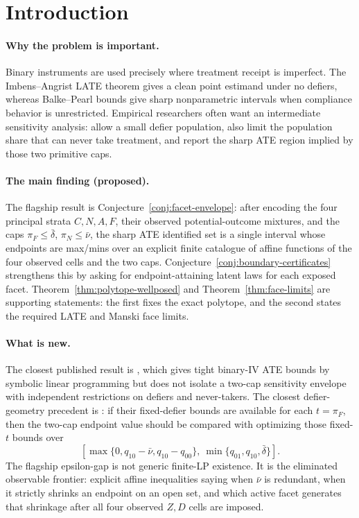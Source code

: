 \documentclass[11pt]{article}
\theoremstyle{definition}
\theoremstyle{plain}
\theoremstyle{remark}
\begin{document}
\section{Introduction}
\paragraph{Why the problem is important.}
Binary instruments are used precisely where treatment receipt is imperfect.
The Imbens--Angrist LATE theorem gives a clean point estimand under no defiers,
whereas Balke--Pearl bounds give sharp nonparametric intervals when compliance
behavior is unrestricted.  Empirical researchers often want an intermediate
sensitivity analysis: allow a small defier population, also limit the population
share that can never take treatment, and report the sharp ATE region implied by
those two primitive caps.

\paragraph{The main finding (proposed).}
The flagship result is Conjecture~\ref{conj:facet-envelope}: after encoding the
four principal strata \(C,N,A,F\), their observed potential-outcome mixtures,
and the caps \(\pi_F\le\bar\delta\), \(\pi_N\le\bar\nu\), the sharp ATE
identified set is a single interval whose endpoints are max/mins over an
explicit finite catalogue of affine functions of the four observed cells and
the two caps.  Conjecture~\ref{conj:boundary-certificates} strengthens this by
asking for endpoint-attaining latent laws for each exposed facet.  Theorem~\ref{thm:polytope-wellposed}
and Theorem~\ref{thm:face-limits} are supporting
statements: the first fixes the exact polytope, and the second states the
required LATE and Manski face limits.

\paragraph{What is new.}
The closest published result is \citet{BalkePearl1997}, which gives tight
binary-IV ATE bounds by symbolic linear programming but does not isolate a
two-cap sensitivity envelope with independent restrictions on defiers and
never-takers.  The closest defier-geometry precedent is
\citet{RichardsonRobins2010}: if their fixed-defier bounds are available for
each \(t=\pi_F\), then the two-cap endpoint value should be compared with
optimizing those fixed-\(t\) bounds over
\[
\left[\max\{0,q_{10}-\bar\nu,q_{10}-q_{00}\},\
\min\{q_{01},q_{10},\bar\delta\}\right].
\]
The flagship epsilon-gap is not generic finite-LP existence.  It is the
eliminated observable frontier: explicit affine inequalities saying when
\(\bar\nu\) is redundant, when it strictly shrinks an endpoint on an open set,
and which active facet generates that shrinkage after all four observed
\(Z,D\) cells are imposed.
\end{document}
